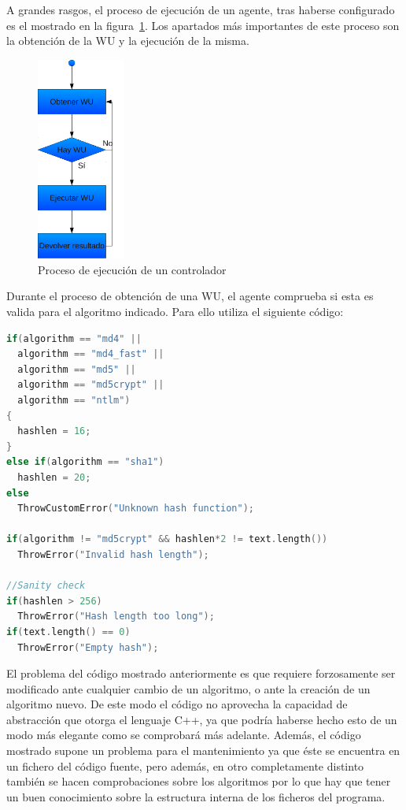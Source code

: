 A grandes rasgos, el proceso de ejecución de un agente, tras haberse configurado es el mostrado en la figura~\ref{fig:cont_proc_ejec}. Los apartados más importantes de este proceso son la obtención de la WU y la ejecución de la misma.

\begin{figure}
	\centering
	\includegraphics[width=0.26\textwidth]{images/proc_cont.pdf}
	\caption{Proceso de ejecución de un controlador}\label{fig:cont_proc_ejec}
\end{figure}

Durante el proceso de obtención de una WU, el agente comprueba si esta es valida para el algoritmo indicado. Para ello utiliza el siguiente código:

\begin{lstlisting}[language=c]
if(algorithm == "md4" || 
  algorithm == "md4_fast" || 
  algorithm == "md5" ||
  algorithm == "md5crypt" ||
  algorithm == "ntlm")
{
  hashlen = 16;
}
else if(algorithm == "sha1")
  hashlen = 20;
else        
  ThrowCustomError("Unknown hash function");
                
if(algorithm != "md5crypt" && hashlen*2 != text.length())
  ThrowError("Invalid hash length");

//Sanity check
if(hashlen > 256)
  ThrowError("Hash length too long");
if(text.length() == 0)
  ThrowError("Empty hash");
\end{lstlisting}

El problema del código mostrado anteriormente es que requiere forzosamente ser modificado ante cualquier cambio de un algoritmo, o ante la creación de un algoritmo nuevo. De este modo el código no aprovecha la capacidad de abstracción que otorga el lenguaje C++, ya que podría haberse hecho esto de un modo más elegante como se comprobará más adelante. Además, el código mostrado supone un problema para el mantenimiento ya que éste se encuentra en un fichero del código fuente, pero además, en otro completamente distinto también se hacen comprobaciones sobre los algoritmos por lo que hay que tener un buen conocimiento sobre la estructura interna de los ficheros del programa.

